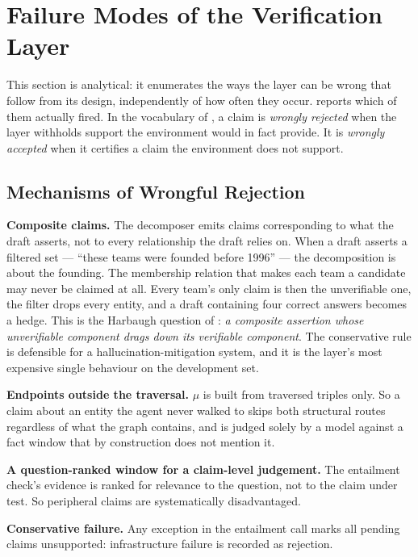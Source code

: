 \section{Failure Modes of the Verification Layer}\label{app:failure-modes}

This section is analytical: it enumerates the ways the layer can be wrong that
follow from its design, independently of how often they occur.
 reports which of them actually fired. In the
vocabulary of , a claim is \emph{wrongly rejected} when the
layer withholds support the environment would in fact provide. It is
\emph{wrongly accepted} when it certifies a claim the environment does not
support.

\subsection*{Mechanisms of Wrongful Rejection}

\textbf{Composite claims.} The decomposer emits claims corresponding to what the
draft asserts, not to every relationship the draft relies on. When a draft
asserts a filtered set --- ``these teams were founded before 1996'' --- the
decomposition is about the founding. The membership relation that makes each
team a candidate may never be claimed at all. Every team's only claim is then
the unverifiable one, the filter drops every entity, and a draft containing four
correct answers becomes a hedge. This is the Harbaugh question of
: \emph{a composite assertion whose unverifiable component
drags down its verifiable component}. The conservative rule is defensible for a
hallucination-mitigation system, and it is the layer's most expensive single
behaviour on the development set.

\textbf{Endpoints outside the traversal.} $\mu$ is built from traversed triples
only. So a claim about an entity the agent never walked to skips both structural
routes regardless of what the graph contains, and is judged solely by a model
against a fact window that by construction does not mention it.

\textbf{A question-ranked window for a claim-level judgement.} The entailment
check's evidence is ranked for relevance to the question, not to the claim under
test. So peripheral claims are systematically disadvantaged.

\textbf{Conservative failure.} Any exception in the entailment call marks all
pending claims unsupported: infrastructure failure is recorded as rejection.


